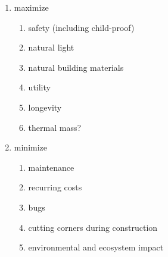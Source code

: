 \documentclass{article}
\begin{document}
\begin{enumerate} %
  \item maximize
  \begin{enumerate}
     \item safety (including child-proof)\label{safety}
     \item natural light \label{light}
     \item natural building materials \label{natural}
     \item utility \label{utility}
     \item longevity \label{longevity} %
     \item thermal mass? \label{thermalmass}
  \end{enumerate}

  \item minimize
    \begin{enumerate}
     \item maintenance \label{maintenance}
     \item recurring costs \label{cost}
     \item bugs \label{bugs}
     \item cutting corners during construction \label{skimping} %
     \item environmental and ecosystem impact \label{environment}
  \end{enumerate}



\end{enumerate}


\end{document}
